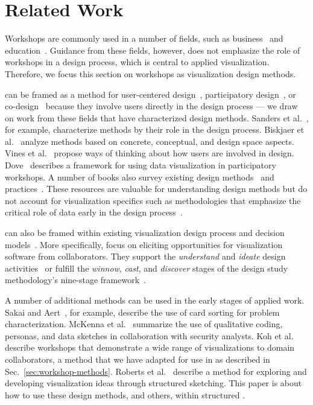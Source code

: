 \section{Related Work}
\label{sec:related}

Workshops are commonly used in a number of fields, such as business~\cite{Gray2010,Hamilton2016,Stanfield2002} and education~\cite{Anderson2000,Brooks-Harris1999}. Guidance from these fields, however, does not emphasize the role of workshops in a design process, which is central to applied visualization. Therefore, we focus this section on workshops as visualization design methods.  

\workshops can be framed as a method for user-centered design~\cite{Norman1986}, participatory design~\cite{Muller1993}, or co-design~\cite{Sanders2008} because they involve users directly in the design process --- we draw on work from these fields that have characterized design methods. Sanders et al.~\cite{Sanders2010}, for example, characterize methods by their role in the design process. Biskjaer et al.~\cite{Biskjaer2017} analyze methods based on concrete, conceptual, and design space aspects. Vines et al.~\cite{Vines2013} propose ways of thinking about how users are involved in design. Dove~\cite{Dove2016} describes a framework for using data visualization in participatory workshops. A number of books also survey existing design methods~\cite{Buxton2010,Kumar2012} and  practices~\cite{Knapp2016,Laural2003,Sanders2013}. These resources are valuable for understanding design methods but do not account for visualization specifics such as methodologies that emphasize the critical role of data early in the design process~\cite{Lloyd2011}.

\workshops can also be framed within existing visualization design process and decision models~\cite{Marai2018,McKenna2014,Munzner2009,Sedlmair2012,Tory2004}. More specifically, \workshops focus on eliciting opportunities for visualization software from collaborators. They support the {\it understand} and {\it ideate} design activities~\cite{McKenna2014} or fulfill the {\it winnow}, {\it cast}, and {\it discover} stages of the design study methodology's nine-stage framework~\cite{Sedlmair2012}.

A number of additional methods can be used in the early stages of applied work. Sakai and Aert~\cite{Sakai2015}, for example, describe the use of card sorting for problem characterization. McKenna et al.~\cite{McKenna2015} summarize the use of qualitative coding, personas, and data sketches in collaboration with security analysts. Koh et al.~\cite{Koh2011} describe workshops that demonstrate a wide range of visualizations to domain collaborators, a method that we have adapted for use in \workshops as described in Sec.~\ref{sec:workshop-methods}. Roberts et al.~\cite{Roberts2016} describe a method for exploring and developing visualization ideas through structured sketching. This paper is about how to use these design methods, and others, within structured \workshops.

